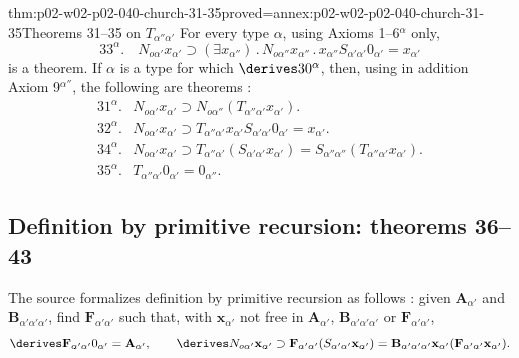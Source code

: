 \begin{hbtheorem}{thm:p02-w02-p02-040-church-31-35}{proved=annex:p02-w02-p02-040-church-31-35}{Theorems 31--35 on \(T_{\alpha''\alpha'}\)}
For every type \(\alpha\), using Axioms 1--6\(^\alpha\) only,
\[
 33^\alpha.\quad N_{o\alpha'}x_{\alpha'}\supset(\exists x_{\alpha''})\,.\,
 N_{o\alpha''}x_{\alpha''}\,.\,x_{\alpha''}S_{\alpha'\alpha'}0_{\alpha'}=x_{\alpha'}
\]
is a theorem.  If \(\alpha\) is a type for which \(\derives30^\alpha\), then,
using in addition Axiom 9\(^{\alpha''}\), the following are theorems
\cite[\S7, pp.~67--68]{Church1940}:
\[
\begin{array}{rl}
 31^\alpha. & N_{o\alpha'}x_{\alpha'}\supset N_{o\alpha''}(T_{\alpha''\alpha'}x_{\alpha'}).\\
 32^\alpha. & N_{o\alpha'}x_{\alpha'}\supset T_{\alpha''\alpha'}x_{\alpha'}S_{\alpha'\alpha'}0_{\alpha'}=x_{\alpha'}.\\
 34^\alpha. & N_{o\alpha'}x_{\alpha'}\supset T_{\alpha''\alpha'}(S_{\alpha'\alpha'}x_{\alpha'})=S_{\alpha''\alpha''}(T_{\alpha''\alpha'}x_{\alpha'}).\\
 35^\alpha. & T_{\alpha''\alpha'}0_{\alpha'}=0_{\alpha''}.
\end{array}
\]
\end{hbtheorem}

\subsection{Definition by primitive recursion: theorems 36--43}

The source formalizes definition by primitive recursion as follows
\cite[\S8, p.~68]{Church1940}: given \(\mathbf A_{\alpha'}\) and
\(\mathbf B_{\alpha'\alpha'\alpha'}\), find \(\mathbf F_{\alpha'\alpha'}\) such
that, with \(\mathbf x_{\alpha'}\) not free in \(\mathbf A_{\alpha'}\),
\(\mathbf B_{\alpha'\alpha'\alpha'}\) or \(\mathbf F_{\alpha'\alpha'}\),
\[
 \derives\mathbf F_{\alpha'\alpha'}0_{\alpha'}=\mathbf A_{\alpha'},\qquad
 \derives N_{o\alpha'}\mathbf x_{\alpha'}\supset
 \mathbf F_{\alpha'\alpha'}(S_{\alpha'\alpha'}\mathbf x_{\alpha'})=
 \mathbf B_{\alpha'\alpha'\alpha'}\mathbf x_{\alpha'}(\mathbf F_{\alpha'\alpha'}\mathbf x_{\alpha'}).
\]

